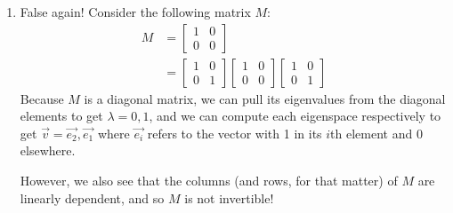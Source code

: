 \begin{enumerate}
{\begin{enumerate}
        Note: remember that one eigenvalue can map to multiple eigenvectors that are linearly independent, so do not confuse the number of eigenvalues with the number of eigenvectors.
        \item False again! Consider the following matrix $M$:
        \begin{align*}
          M &= \begin{bmatrix}1&0\\
                              0&0\end{bmatrix}\\
            &= \begin{bmatrix}1&0\\
                              0&1\end{bmatrix}
                \begin{bmatrix}1&0\\
                               0&0\end{bmatrix}
                \begin{bmatrix}1&0\\
                               0&1\end{bmatrix}
        \end{align*}
        Because $M$ is a diagonal matrix, we can pull its eigenvalues from the diagonal elements to get $\lambda = 0, 1$, and we can compute each eigenspace respectively to get $\vec{v} = \vec{e_2}, \vec{e_1}$ where $\vec{e_i}$ refers to the vector with 1 in its $i$th element and 0 elsewhere.

        However, we also see that the columns (and rows, for that matter) of $M$ are linearly dependent, and so $M$ is not invertible!
\end{enumerate}
}

\end{enumerate}
